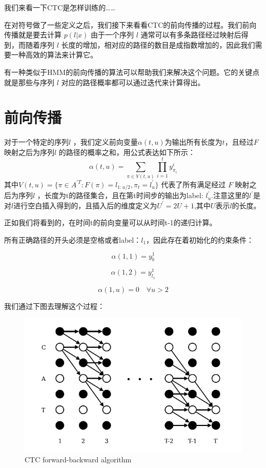 \documentclass[]{book}
\theoremstyle{definition}
\theoremstyle{definition}
\theoremstyle{definition}
\theoremstyle{remark}
\begin{document}
我们来看一下CTC是怎样训练的\ldots{}\ldots{}

在对符号做了一些定义之后，我们接下来看看CTC的前向传播的过程。我们前向传播就是要去计算
\(p(l|x)\) 由于一个序列 \(l\)
通常可以有多条路径经过映射后得到，而随着序列 \(l\)
长度的增加，相对应的路径的数目是成指数增加的，因此我们需要一种高效的算法来计算它。

有一种类似于HMM的前向传播的算法可以帮助我们来解决这个问题。它的关键点就是那些与序列
\(l\) 对应的路径概率都可以通过迭代来计算得出。

\section{前向传播}

对于一个特定的序列\(l\)
，我们定义前向变量\(\alpha(t,u)\)为输出所有长度为\(t\)，且经过\(F\)
映射之后为序列\(l\) 的路径的概率之和，用公式表达如下所示：
\[\alpha(t,u)=\sum_{\pi \in V(t,u)}\prod_{i=1}^{t}y_{\pi_i}^{i}\]
其中\(V(t,u)=\{\pi \in A^{'T}:F(\pi)=l_{1:u/2},\pi_t=l_u^{'}\}\)
代表了所有满足经过 \(F\) 映射之后为序列\(l\)
，长度为t的路径集合，且在第t时间步的输出为label:
\(l_u^{'}\).注意这里的\(l^{'}\)是对\(l\)进行空白插入得到的，且插入后的维度定义为\(U^{'}=2U+1\),其中\(U\)表示\(l\)的长度。

正如我们将看到的，在时间t的前向变量可以从时间t-1的递归计算。

所有正确路径的开头必须是空格或者label：\(l_1\)，因此存在着初始化的约束条件：

\[\alpha(1,1) = y_b^1\]

\[\alpha(1,2) = y_{l_1}^1\]

\[\alpha(1,u) = 0 \quad \forall u>2\]

我们通过下图去理解这个过程：

\begin{figure}

{\centering \includegraphics[width=1.5\linewidth]{pic/fig_3} 

}

\caption{CTC forward-backward algorithm}\label{fig:unnamed-chunk-3}
\end{figure}
\end{document}
